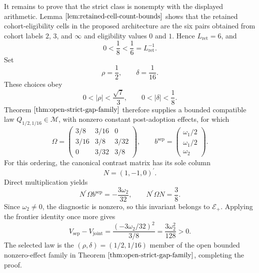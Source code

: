 It remains to prove that the strict class is nonempty with the displayed arithmetic. Lemma \(\ref{lem:retained-cell-count-bounds}\) shows that the retained cohort-eligibility cells in the proposed architecture are the six pairs obtained from cohort labels \(2\), \(3\), and \(\infty\) and eligibility values \(0\) and \(1\). Hence \(L_{\mathrm{ret}}=6\), and
\[
 0<\frac18<\frac16=L_{\mathrm{ret}}^{-1}.
\]
Set
\[
 \rho=\frac12,
 \qquad
 \delta=\frac1{16}.
\]
These choices obey
\[
 0<|\rho|<\frac{\sqrt7}{3},
 \qquad
 0<|\delta|<\frac18.
\]
Theorem \(\ref{thm:open-strict-gap-family}\) therefore supplies a bounded compatible law \(Q_{1/2,1/16}\in\mathcal M\), with nonzero constant post-adoption effects, for which
\[
 \Omega=
 \begin{pmatrix}
 3/8&3/16&0\\
 3/16&3/8&3/32\\
 0&3/32&3/8
 \end{pmatrix},
 \qquad
 b^{\mathrm{sep}}=
 \begin{pmatrix}
 \omega_1/2\\
 \omega_1/2\\
 \omega_2
 \end{pmatrix}.
\]
For this ordering, the canonical contrast matrix has its sole column
\[
 N=(1,-1,0)^{\prime}.
\]
Direct multiplication yields
\[
 N^{\prime}\Omega b^{\mathrm{sep}}=-\frac{3\omega_2}{32},
 \qquad
 N^{\prime}\Omega N=\frac38.
\]
Since \(\omega_2\ne0\), the diagnostic is nonzero, so this invariant belongs to \(\mathscr E_+\). Applying the frontier identity once more gives
\[
 V_{\mathrm{sep}}-V_{\mathrm{joint}}
 =\frac{(-3\omega_2/32)^2}{3/8}
 =\frac{3\omega_2^2}{128}>0.
\]
The selected law is the \((\rho,\delta)=(1/2,1/16)\) member of the open bounded nonzero-effect family in Theorem \(\ref{thm:open-strict-gap-family}\), completing the proof.